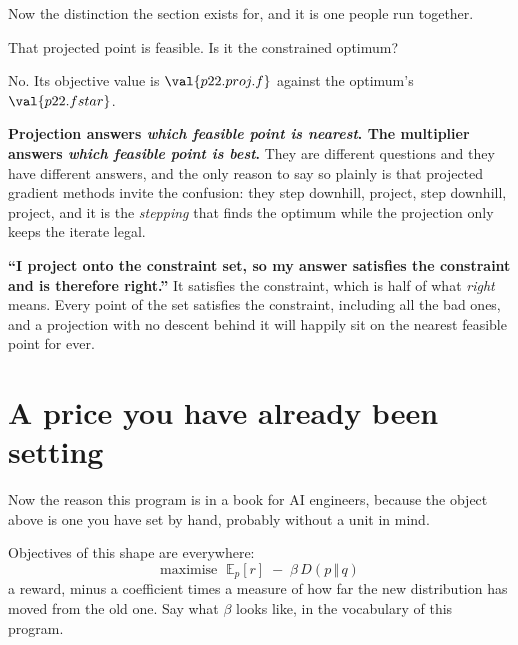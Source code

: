 \begin{fr}
Now the distinction the section exists for, and it is one people run together.

That projected point is feasible. Is it the constrained optimum?
\nextframe
\end{fr}

\begin{fr}
\begin{ansblock}
No. Its objective value is $\val{p22.proj.f}$ against the optimum's
$\val{p22.fstar}$.
\end{ansblock}

\textbf{Projection answers \emph{which feasible point is nearest}. The
multiplier answers \emph{which feasible point is best}.} They are different
questions and they have different answers, and the only reason to say so
plainly is that projected gradient methods invite the confusion: they step
downhill, project, step downhill, project, and it is the \emph{stepping} that
finds the optimum while the projection only keeps the iterate legal.

\begin{trapbox}
\textbf{\enquote{I project onto the constraint set, so my answer satisfies the
constraint and is therefore right.}} It satisfies the constraint, which is half
of what \emph{right} means. Every point of the set satisfies the constraint,
including all the bad ones, and a projection with no descent behind it will
happily sit on the nearest feasible point for ever.
\end{trapbox}
\end{fr}

\section{A price you have already been setting}
\label{sec:P22-penalty}

\begin{fr}
Now the reason this program is in a book for AI engineers, because the object
above is one you have set by hand, probably without a unit in mind.

Objectives of this shape are everywhere:
\[ \text{maximise } \;\mathbb{E}_{p}[r] \;-\; \beta \, D(p \,\Vert\, q) \]
a reward, minus a coefficient times a measure of how far the new distribution
has moved from the old one. Say what $\beta$ looks like, in the vocabulary of
this program.
\dotline
\nextframe
\end{fr}

